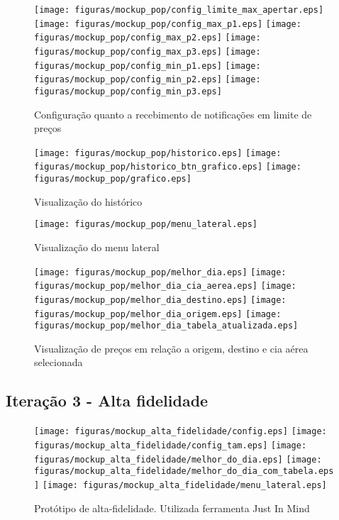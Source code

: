 	\begin{figure}[h]
		\centering
			\texttt{[image: figuras/mockup\_pop/config\_limite\_max\_apertar.eps]}
			\texttt{[image: figuras/mockup\_pop/config\_max\_p1.eps]}
			\texttt{[image: figuras/mockup\_pop/config\_max\_p2.eps]}
			\texttt{[image: figuras/mockup\_pop/config\_max\_p3.eps]}
			\texttt{[image: figuras/mockup\_pop/config\_min\_p1.eps]}
			\texttt{[image: figuras/mockup\_pop/config\_min\_p2.eps]}
			\texttt{[image: figuras/mockup\_pop/config\_min\_p3.eps]}
		\caption{Configuração quanto a recebimento de notificações em limite de preços}
	\end{figure}

	\begin{figure}[h]
		\centering
			\texttt{[image: figuras/mockup\_pop/historico.eps]}
			\texttt{[image: figuras/mockup\_pop/historico\_btn\_grafico.eps]}
			\texttt{[image: figuras/mockup\_pop/grafico.eps]}
		\caption{Visualização do histórico}
	\end{figure}

	\begin{figure}[h]
		\centering
			\texttt{[image: figuras/mockup\_pop/menu\_lateral.eps]}
		\caption{Visualização do menu lateral}
	\end{figure}

	\begin{figure}[h]
		\centering
			\texttt{[image: figuras/mockup\_pop/melhor\_dia.eps]}
			\texttt{[image: figuras/mockup\_pop/melhor\_dia\_cia\_aerea.eps]}
			\texttt{[image: figuras/mockup\_pop/melhor\_dia\_destino.eps]}
			\texttt{[image: figuras/mockup\_pop/melhor\_dia\_origem.eps]}
			\texttt{[image: figuras/mockup\_pop/melhor\_dia\_tabela\_atualizada.eps]}
		\caption{Visualização de preços em relação a origem, destino e cia aérea selecionada}
	\end{figure}

\subsection{Iteração 3 - Alta fidelidade}

	\begin{figure}[h]
		\centering
			\texttt{[image: figuras/mockup\_alta\_fidelidade/config.eps]}
			\texttt{[image: figuras/mockup\_alta\_fidelidade/config\_tam.eps]}
			\texttt{[image: figuras/mockup\_alta\_fidelidade/melhor\_do\_dia.eps]}
			\texttt{[image: figuras/mockup\_alta\_fidelidade/melhor\_do\_dia\_com\_tabela.eps]}
			\texttt{[image: figuras/mockup\_alta\_fidelidade/menu\_lateral.eps]}
		\caption{Protótipo de alta-fidelidade. Utilizada ferramenta Just In Mind}
	\end{figure}
